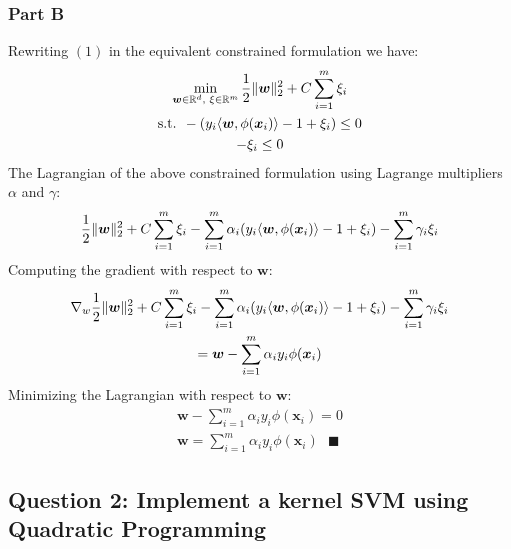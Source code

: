 \documentclass[11pt, oneside]{article}   	%
\begin{document}
\subsubsection{Part B}
Rewriting $(1)$ in the equivalent constrained formulation we have:
\begin{gather*}
\min_{\boldsymbol{w} \in \mathbb{R}^d, \text{ } \xi \in \mathbb{R}^m} \frac{1}{2} \lVert\boldsymbol{w}\rVert_2^2 + C\sum_{i = 1}^m \xi_i\\
\text{s.t. } -(y_i \langle \boldsymbol{w}, \phi(\boldsymbol{x}_i) \rangle - 1 + \xi_i) \leq 0\\
-\xi_i \leq 0
\end{gather*}
The Lagrangian of the above constrained formulation using Lagrange multipliers $\alpha$ and $\gamma$:
\begin{gather*}
\frac{1}{2} \lVert\boldsymbol{w}\rVert_2^2 + C\sum_{i = 1}^m \xi_i - \sum_{i = 1}^m \alpha_i(y_i \langle \boldsymbol{w}, \phi(\boldsymbol{x}_i) \rangle - 1 + \xi_i) - \sum_{i = 1}^m \gamma_i \xi_i
\end{gather*}
Computing the gradient with respect to $\boldsymbol{w}$:
\begin{gather*}
\nabla_w \frac{1}{2} \lVert\boldsymbol{w}\rVert_2^2 + C\sum_{i = 1}^m \xi_i - \sum_{i = 1}^m \alpha_i(y_i \langle \boldsymbol{w}, \phi(\boldsymbol{x}_i) \rangle - 1 + \xi_i) - \sum_{i = 1}^m \gamma_i \xi_i\\
= \boldsymbol{w} - \sum_{i = 1}^m \alpha_i y_i \phi(\boldsymbol{x}_i)
\end{gather*}
Minimizing the Lagrangian with respect to $\boldsymbol{w}$:
\begin{gather*}
\boldsymbol{w} - \sum_{i = 1}^m \alpha_i y_i \phi(\boldsymbol{x}_i) = 0\\
\boldsymbol{w} = \sum_{i = 1}^m \alpha_i y_i \phi(\boldsymbol{x}_i) \text{ } \blacksquare
\end{gather*}

\newpage{}
\subsection{Question 2: Implement a kernel SVM using Quadratic Programming}
\end{document}
